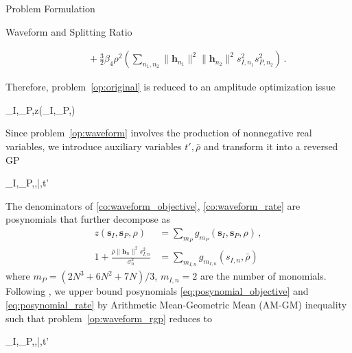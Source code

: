 \documentclass[journal]{IEEEtran}
\begin{document}
\begin{section}{Problem Formulation}
\begin{subsection}{Waveform and Splitting Ratio}
\begin{figure*}[b]
\begin{align}
					& \quad + \frac{3}{2}{\beta_4}{\rho^2} \left( \sum_{n_1,n_2} \lVert{\boldsymbol{h}_{n_1}}\rVert^2 \lVert{\boldsymbol{h}_{n_2}}\rVert^2 s_{I,{n_1}}^2 s_{P,{n_2}}^2 \right)\,.\label{eq:z_waveform}
				\end{align}
			\end{figure*}%
			Therefore, problem~\ref{op:original} is reduced to an amplitude optimization issue
			\begin{maxi!}
				{\boldsymbol{s}_I,_P,\rho}{z(\boldsymbol{s}_I,_P,\rho)}{\label{op:waveform}}{}
			\end{maxi!}
			Since problem~\ref{op:waveform} involves the production of nonnegative real variables, we introduce auxiliary variables $t',\bar{\rho}$ and transform it into a reversed GP
			\begin{mini!}
				{\boldsymbol{s}_I,_P,\rho,\bar{\rho},t'}{}{\label{op:waveform_rgp}}{}
				\label{co:waveform_power}
				\label{co:waveform_objective}
				\label{co:waveform_rate}
			\end{mini!}
			The denominators of \ref{co:waveform_objective}, \ref{co:waveform_rate} are posynomials \cite{Boyd2007} that further decompose as
			\begin{align}
				z(\boldsymbol{s}_I,\boldsymbol{s}_P,\rho)&=\sum_{m_P}{g_{m_P}(\boldsymbol{s}_I,\boldsymbol{s}_P,\rho)}\label{eq:posynomial_objective}\,,\\
				1+\frac{\bar{\rho}\lVert{\boldsymbol{h}_n}\rVert^2 s_{I,n}^2}{\sigma_n^2}&=\sum_{m_{I,n}}g_{m_{I,n}}(s_{I,n},\bar{\rho})\label{eq:posynomial_rate}
			\end{align}
			where $m_P=(2N^3+6N^2+7N)/3$, $m_{I,n}=2$ are the number of monomials. Following \cite{Chiang2005}, we upper bound posynomials \ref{eq:posynomial_objective} and \ref{eq:posynomial_rate} by Arithmetic Mean-Geometric Mean (AM-GM) inequality such that problem~\ref{op:waveform_rgp} reduces to
			\begin{mini!}
				{\boldsymbol{s}_I,_P,\rho,\bar{\rho},t'}{}{\label{op:waveform_gp}}{}

\end{mini!}
\end{subsection}
\end{section}
\end{document}
